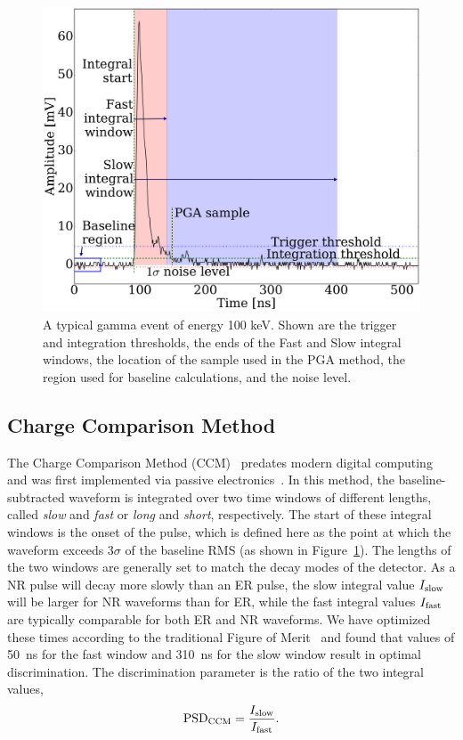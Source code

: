 \begin{figure}[htbp]
\centering
    \includegraphics[width=\columnwidth]{figures/psd/fig_annotated_event}
    \caption{A typical gamma event of energy 100 keV. Shown are the trigger and integration thresholds, the ends of the Fast and Slow integral windows, the location of the sample used in the PGA method, the region used for baseline calculations, and the noise level.}\label{fig:psd_waveform}
\end{figure}

\subsection{Charge Comparison Method}

The Charge Comparison Method (CCM)~\cite{Cester:2014,Kaschuck:2005,Liao:2014,WOLSKI:1995,Klein:2002,Ranucci:1998,Soderstrom:2008,Ranucci:1995} predates modern digital computing and was first implemented via passive electronics~\cite{Alexander:1961}. In this method, the baseline-subtracted waveform is integrated over two time windows of different lengths, called \textit{slow} and \textit{fast} or \textit{long} and \textit{short}, respectively. The start of these integral windows is the onset of the pulse, which is defined here as the point at which the waveform exceeds 3$\sigma$ of the baseline RMS (as shown in Figure~\ref{fig:psd_waveform}). The lengths of the two windows are generally set to match the decay modes of the detector. As a NR pulse will decay more slowly than an ER pulse, the slow integral value $I_{\mathrm{slow}}$ will be larger for NR waveforms than for ER, while the fast integral values $I_{\mathrm{fast}}$ are typically comparable for both ER and NR waveforms. We have optimized these times according to the traditional Figure of Merit~\cite{Annand:1987} and found that values of 50~ns for the fast window and 310~ns for the slow window result in optimal discrimination. The discrimination parameter is the ratio of the two integral values,
\begin{equation}
\mathrm{PSD}_{\mathrm{CCM}} = \frac{I_{\mathrm{slow}}}{I_{\mathrm{fast}}}.
\end{equation}

